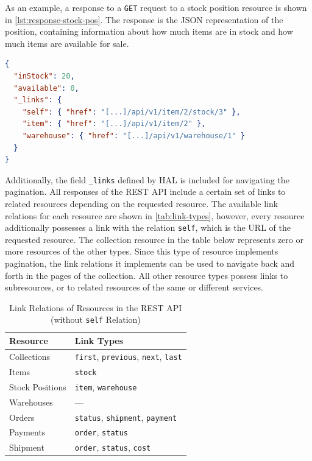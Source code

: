 As an example, a response to a \texttt{GET} request to a stock position resource is shown in \autoref{lst:response-stock-pos}.
The response is the \ac{JSON} representation of the position, containing information about how much items are in stock and how much items are available for sale.

\begin{lstlisting}[caption={Response to Fetching the Stock Position Collection}, language=json, label={lst:response-stock-pos}]
{
  "inStock": 20,
  "available": 0,
  "_links": {
    "self": { "href": "[...]/api/v1/item/2/stock/3" },
    "item": { "href": "[...]/api/v1/item/2" },
    "warehouse": { "href": "[...]/api/v1/warehouse/1" }
  }
}
\end{lstlisting}

Additionally, the field \texttt{\_links} defined by \ac{HAL} is included for navigating the pagination.
All responses of the \ac{REST} \ac{API} include a certain set of links to related resources depending on the requested resource.
The available link relations for each resource are shown in \autoref{tab:link-types}, however, every resource additionally possesses a link with the relation \texttt{self}, which is the URL of the requested resource.
The collection resource in the table below represents zero or more resources of the other types.
Since this type of resource implements pagination, the link relations it implements can be used to navigate back and forth in the pages of the collection.
All other resource types possess links to subresources, or to related resources of the same or different services.

\begin{table}[ht]
    \centering
    \begin{tabular}{@{}ll@{}}
        \toprule
        \textbf{Resource}   & \textbf{Link Types} \\
        \midrule
        Collections         & \texttt{first}, \texttt{previous}, \texttt{next}, \texttt{last} \\
        \midrule
        Items               & \texttt{stock} \\
        Stock Positions     & \texttt{item}, \texttt{warehouse} \\
        Warehouses          & --- \\
        \midrule
        Orders              & \texttt{status}, \texttt{shipment}, \texttt{payment} \\
        \midrule
        Payments            & \texttt{order}, \texttt{status} \\
        \midrule
        Shipment            & \texttt{order}, \texttt{status}, \texttt{cost} \\
        \bottomrule
    \end{tabular}
    \caption{Link Relations of Resources in the \ac{REST} \ac{API} (without \texttt{self} Relation)}\label{tab:link-types}
\end{table}

